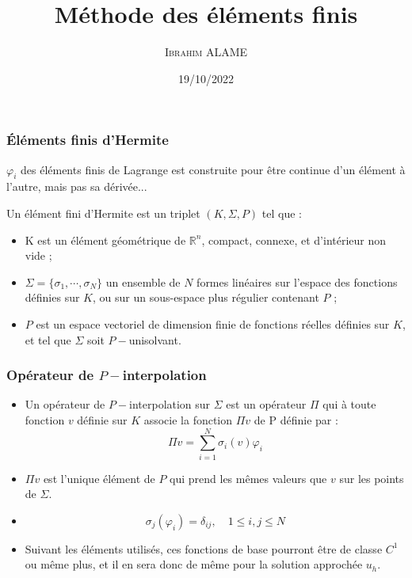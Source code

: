 \documentclass{beamer}
\title{Méthode des éléments finis}
\author{ \textsc{Ibrahim ALAME}}\institute{ESTP}
\date{19/10/2022}
\begin{document}
 \begin{frame}
  \titlepage
  \end{frame}
  
\begin{frame}
\frametitle{Éléments finis d'Hermite}
$\varphi_i$ des éléments finis de Lagrange est construite pour être continue d'un élément à l'autre, mais pas sa dérivée... 

Un élément fini d'Hermite est un triplet $(K,\Sigma,P)$ tel que :
\begin{itemize}
\item K est un élément géométrique de $\mathbb{R}^n$, compact, connexe, et d'intérieur non vide ;
\item $\Sigma=\{\sigma_1,\cdots,\sigma_N\}$ un ensemble de $N$ formes linéaires sur l'espace des fonctions définies sur $K$, ou sur un sous-espace plus régulier contenant $P$ ;
\item $P$ est un espace vectoriel de dimension finie de fonctions réelles définies sur $K$, et tel que $\Sigma$ soit $P-$unisolvant.
\end{itemize}
\end{frame}
\begin{frame}
\frametitle{Opérateur de $P-$interpolation }


\begin{itemize}
\item Un opérateur de $P-$interpolation sur $\Sigma$ est un opérateur $\Pi$ qui à toute fonction $v$ définie sur $K$ associe la fonction $\Pi v$ de P définie par :
\[\Pi v=\sum_{i=1}^N\sigma_i(v)\varphi_i\]
\item $\Pi v$  est l'unique élément de $P$ qui prend les mêmes valeurs que $v$ sur les points de $\Sigma$.
\item
\[\sigma_j(\varphi_i)=\delta_{ij},\quad 1\leq i,j \leq N\]
\item Suivant les éléments utilisés, ces fonctions de base pourront être de classe $C^1$ ou même plus, et il en sera donc de même pour la solution approchée $u_h$.
\end{itemize}

\end{frame}
\end{document}
